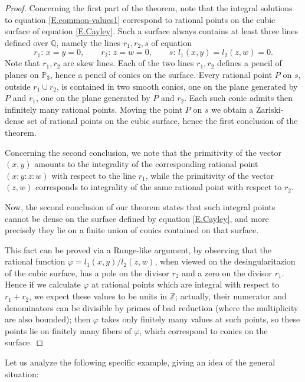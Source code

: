 \documentclass[leqno,12pt]{article} %
\def\Z{{{\mathbb Z}}}
\def\Q{{{\mathbb Q}}}
\def\P{{{\mathbb P}}}
\theoremstyle{plain} %
\theoremstyle{definition} %
\begin{document}
\begin{proof}
Concerning the first part of the theorem, note that the integral solutions to equation \eqref{E.common-values1} correspond to rational points on the cubic surface of equation \eqref{E.Cayley}. Such a surface  always contains at least three lines defined over $\Q$, namely the lines $r_1,r_2,s$ of equation 
$$
r_1:\, x=y=0, \qquad  r_2:\, z=w=0, \qquad s:\, l_1(x,y)=l_2(z,w)=0.
$$
Note that $r_1,r_2$ are  skew lines. Each of the two  lines $r_1,r_2$ defines a pencil of planes on $\P_3$, hence a pencil of conics on the surface. Every rational point $P$ on $s$, outside $r_1\cup r_2$,   is contained in two smooth conics, one on the plane generated by $P$ and $r_1$, one on the plane generated by $P$ and $r_2$. Each such conic admits then infinitely many rational points.  Moving the point $P$ on $s$ we obtain a Zariski-dense set of rational points on the cubic surface, hence the first conclusion of the theorem.

\smallskip

Concerning the second conclusion, we note that the primitivity of the vector $(x,y)$ amounts to the integrality of the corresponding rational point $(x:y:z:w)$ with respect to the line $r_1$, while the primitivity of the vector $(z,w)$ corresponds to integrality of the same rational point with respect to $r_2$.

Now, the second conclusion of our theorem states that such integral points cannot be dense on the surface defined by equation \eqref{E.Cayley}, and more precisely they lie on a finite union of  conics contained on that surface.

This fact can be proved via a Runge-like argument, by observing that the rational function $\varphi=l_1(x,y)/l_2(z,w)$, when viewed on the desingularitazion of the cubic surface, has a pole on the divisor $r_2$ and a zero on the divisor $r_1$. Hence if we calculate $\varphi$ at  rational points which are integral with respect to $r_1+r_2$, we expect these values to be units in $\Z$; actually, their numerator and denominators can be divisible by primes of bad reduction  (where the multiplicity are also bounded);  then $\varphi$ takes only finitely many values at such points,  so these points lie on finitely many fibers of $\varphi$, which correspond to conics on the surface.
\end{proof}
\medskip



Let us  analyze the following specific example, giving an idea of the general situation: 
\end{document}
